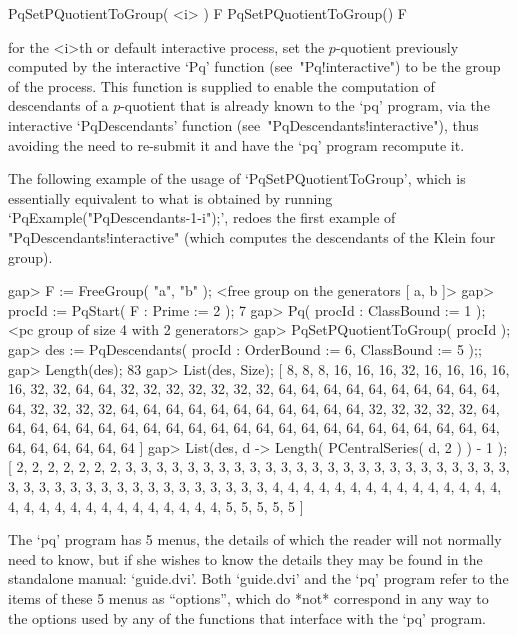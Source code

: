 \>PqSetPQuotientToGroup( <i> ) F
\>PqSetPQuotientToGroup() F

for  the  <i>th  or  default  interactive  {\ANUPQ}  process,   set   the
$p$-quotient  previously  computed  by  the  interactive  `Pq'   function
(see~"Pq!interactive") to be the group of the process. This  function  is
supplied to enable the computation of descendants of a $p$-quotient  that
is already known to the `pq' program, via the interactive  `PqDescendants'
function (see~"PqDescendants!interactive"), thus  avoiding  the  need  to
re-submit it and have the `pq' program recompute it.

The following example of the usage of `PqSetPQuotientToGroup',  which  is
essentially   equivalent    to    what    is    obtained    by    running
`PqExample("PqDescendants-1-i");',   redoes   the   first   example    of
"PqDescendants!interactive" (which computes the descendants of the  Klein
four group).

\beginexample
gap> F := FreeGroup( "a", "b" );
<free group on the generators [ a, b ]>
gap> procId := PqStart( F : Prime := 2 );
7
gap> Pq( procId : ClassBound := 1 );
<pc group of size 4 with 2 generators>
gap> PqSetPQuotientToGroup( procId );
gap> des := PqDescendants( procId : OrderBound := 6, ClassBound := 5 );;
gap> Length(des);
83
gap> List(des, Size);
[ 8, 8, 8, 16, 16, 16, 32, 16, 16, 16, 16, 16, 32, 32, 64, 64, 32, 32, 32, 
  32, 32, 32, 32, 64, 64, 64, 64, 64, 64, 64, 64, 64, 64, 64, 32, 32, 32, 32, 
  64, 64, 64, 64, 64, 64, 64, 64, 64, 64, 64, 32, 32, 32, 32, 32, 64, 64, 64, 
  64, 64, 64, 64, 64, 64, 64, 64, 64, 64, 64, 64, 64, 64, 64, 64, 64, 64, 64, 
  64, 64, 64, 64, 64, 64, 64 ]
gap> List(des, d -> Length( PCentralSeries( d, 2 ) ) - 1 );
[ 2, 2, 2, 2, 2, 2, 2, 3, 3, 3, 3, 3, 3, 3, 3, 3, 3, 3, 3, 3, 3, 3, 3, 3, 3, 
  3, 3, 3, 3, 3, 3, 3, 3, 3, 3, 3, 3, 3, 3, 3, 3, 3, 3, 3, 3, 3, 3, 3, 3, 4, 
  4, 4, 4, 4, 4, 4, 4, 4, 4, 4, 4, 4, 4, 4, 4, 4, 4, 4, 4, 4, 4, 4, 4, 4, 4, 
  4, 4, 4, 5, 5, 5, 5, 5 ]
\endexample


The `pq' program has 5 menus, the details of which  the  reader  will  not
normally need to know, but if she wishes to know the details they may  be
found in the standalone manual: `guide.dvi'.  Both  `guide.dvi'  and  the
`pq' program refer to the items of these 5 menus as ``options'', which  do
*not* correspond in any way to the options used  by  any  of  the  {\GAP}
functions that interface with the `pq' program.

